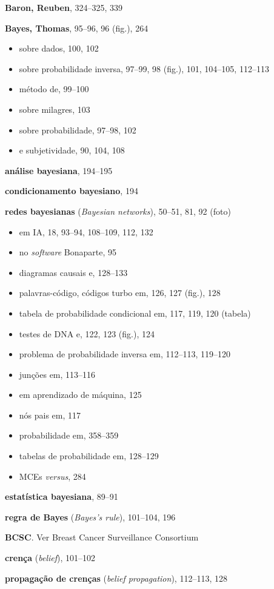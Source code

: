 \documentclass[11pt,a5paper,twoside]{book}
\begin{document}
\textbf{Baron, Reuben}, 324–325, 339

\textbf{Bayes, Thomas}, 95–96, 96 (fig.), 264

\begin{itemize}
\item sobre dados, 100, 102
\item sobre probabilidade inversa, 97–99, 98 (fig.), 101, 104–105, 112–113
\item método de, 99–100
\item sobre milagres, 103
\item sobre probabilidade, 97–98, 102
\item e subjetividade, 90, 104, 108
\end{itemize}
\textbf{análise bayesiana}, 194–195

\textbf{condicionamento bayesiano}, 194

\textbf{redes bayesianas} (\textit{Bayesian networks}), 50–51, 81, 92 (foto)

\begin{itemize}
\item em IA, 18, 93–94, 108–109, 112, 132
\item no \textit{software} Bonaparte, 95
\item diagramas causais e, 128–133
\item palavras-código, códigos turbo em, 126, 127 (fig.), 128
\item tabela de probabilidade condicional em, 117, 119, 120 (tabela)
\item testes de DNA e, 122, 123 (fig.), 124
\item problema de probabilidade inversa em, 112–113, 119–120
\item junções em, 113–116
\item em aprendizado de máquina, 125
\item nós pais em, 117
\item probabilidade em, 358–359
\item tabelas de probabilidade em, 128–129
\item MCEs \textit{versus}, 284
\end{itemize}
\textbf{estatística bayesiana}, 89–91

\textbf{regra de Bayes} (\textit{Bayes’s rule}), 101–104, 196

\textbf{BCSC}. Ver Breast Cancer Surveillance Consortium

\textbf{crença} (\textit{belief}), 101–102

\textbf{propagação de crenças} (\textit{belief propagation}), 112–113, 128
\end{document}
